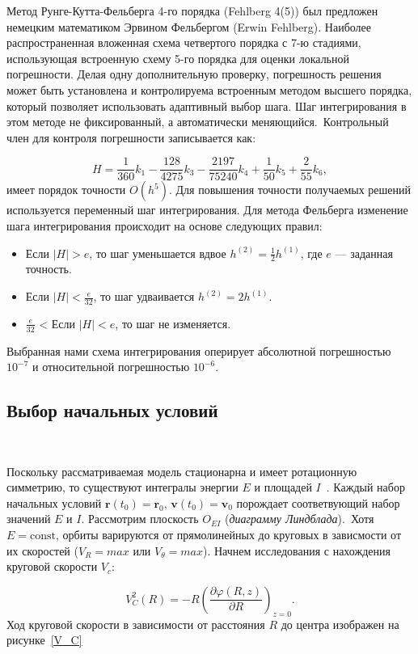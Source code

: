 Метод Рунге-Кутта-Фельберга 4-го порядка (Fehlberg 4(5)) был предложен немецким математиком Эрвином Фельбергом (Erwin Fehlberg). Наиболее распространенная вложенная схема четвертого порядка с 7-ю стадиями, использующая встроенную схему 5-го порядка для оценки локальной погрешности. Делая одну дополнительную проверку, погрешность решения может быть установлена и контролируема встроенным методом высшего порядка, который позволяет использовать адаптивный выбор шага. Шаг интегрирования в этом методе не фиксированный, а автоматически меняющийся.\
Контрольный член для контроля погрешности записывается как:

$$
H = \frac{1}{360}k_1 - \frac{128}{4275}k_3 - \frac{2197}{75240}k_4 + \frac{1}{50}k_5 + \frac{2}{55}k_6,
$$
имеет порядок точности $O(h^5)$.
Для повышения точности получаемых решений используется переменный шаг интегрирования. Для метода Фельберга изменение шага интегрирования происходит на основе следующих правил:

\begin{itemize}
\item Если $|H| > e$, то шаг уменьшается вдвое $h^{(2)} = \frac{1}{2}h^{(1)}$, где $e$ --- заданная точность.

\item Если $|H| < \frac{e}{32}$, то шаг удваивается $h^{(2)} = 2h^{(1)}$.

\item $\frac{e}{32}$ < Если $|H| < e$, то шаг не изменяется.
\end{itemize}

Выбранная нами схема интегрирования оперирует абсолютной погрешностью $10^{-7}$ и относительной погрешностью $10^{-6}$.

\subsection{Выбор начальных условий}
~\par
Поскольку рассматриваемая модель стационарна и имеет ротационную симметрию, то существуют интегралы энергии $E$ и площадей $I$~\cite{ogor}. Каждый набор начальных условий $\textbf{r}(t_0)=\textbf{r}_0,\, \textbf{v}(t_0)=\textbf{v}_0$ порождает соответвующий набор значений $E$ и $I$. Рассмотрим плоскость $O_{EI}$ (\emph{диаграмму Линдблада}).\
Хотя $E=\text{const}$, орбиты варируются от прямолинейных до круговых в зависмости от их скоростей ($V_R=max$ или $V_\theta=max$). Начнем исследования с нахождения круговой скорости $V_c$:

$$
V_C^2(R) = -R \left( \frac{\partial \varphi(R,z)}{\partial R} \right)_{z=0}.
$$
Ход круговой скорости в зависимости от расстояния $R$ до центра изображен на рисунке~\ref{V_C}

